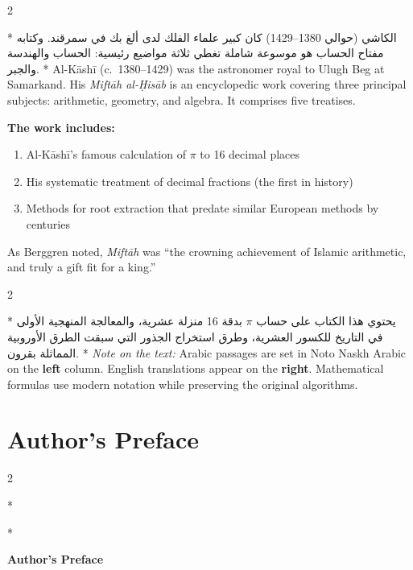 \documentclass[11pt,a4paper]{article}
\newcommand{\ar}[1]{{\arabicfont\beginR #1\endR}}
\newenvironment{bilingual}{%
  \vspace{0.3em}%
  \begin{paracol}{2}%
}{%
  \end{paracol}%
  \vspace{0.3em}%
}
\begin{document}
\begin{bilingual}
\switchcolumn[0]*
\ar{الكاشي (حوالي 1380--1429) كان كبير علماء الفلك لدى ألغ بك في سمرقند. وكتابه مفتاح الحساب هو موسوعة شاملة تغطي ثلاثة مواضيع رئيسية: الحساب والهندسة والجبر.}
\switchcolumn[1]*
Al-K\=ash\=i (c.\ 1380--1429) was the astronomer royal to Ulugh Beg at
Samarkand. His \textit{Mift\=ah al-\d{H}is\=ab} is an encyclopedic work covering
three principal subjects: arithmetic, geometry, and algebra. It comprises
five treatises.
\end{bilingual}

\textbf{The work includes:}
\begin{enumerate}[nosep]
  \item Al-K\=ash\=i's famous calculation of $\pi$ to 16 decimal places
  \item His systematic treatment of decimal fractions (the first in history)
  \item Methods for root extraction that predate similar European methods by centuries
\end{enumerate}

As Berggren noted, \textit{Mift\=ah} was ``the crowning achievement of Islamic arithmetic, and truly a gift fit for a king.''

\begin{bilingual}
\switchcolumn[0]*
\ar{يحتوي هذا الكتاب على حساب $\pi$ بدقة 16 منزلة عشرية، والمعالجة المنهجية الأولى في التاريخ للكسور العشرية، وطرق استخراج الجذور التي سبقت الطرق الأوروبية المماثلة بقرون.}
\switchcolumn[1]*
\textit{Note on the text:} Arabic passages are set in Noto Naskh
Arabic on the \textbf{left} column. English translations appear on the \textbf{right}. Mathematical formulas use modern notation while preserving the
original algorithms.
\end{bilingual}
\clearpage

\section*{Author's Preface}

\begin{bilingual}
\switchcolumn[0]*
\begin{center}
\textbf{\color{chapcolor}\ar{تمهيد المؤلف}}
\end{center}
\switchcolumn[1]*
\begin{center}
\textbf{\color{chapcolor}Author's Preface}
\end{center}
\end{bilingual}
\end{document}
